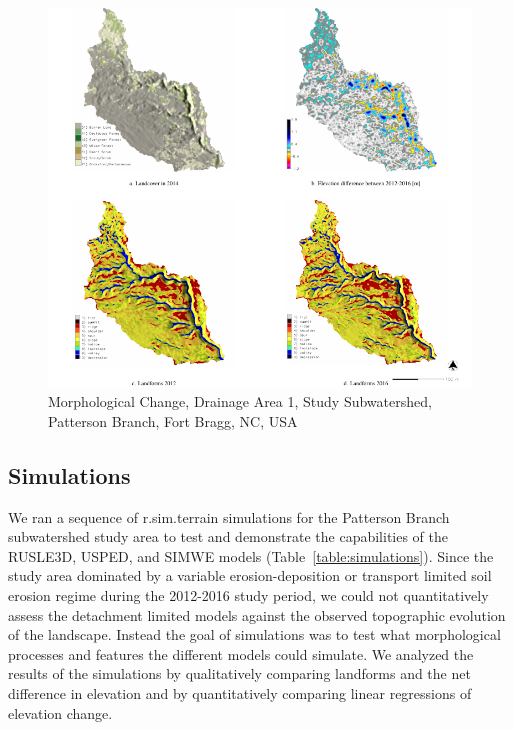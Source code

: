 \documentclass[gmd, manuscript]{copernicus}
\begin{document}
\begin{figure}
\center
\includegraphics[width=\textwidth,height=0.95\textheight,keepaspectratio]{figures/study_area.pdf}
\caption{Morphological Change, Drainage Area 1, Study Subwatershed, Patterson Branch, Fort Bragg, NC, USA}
\label{fig:study_area}
\end{figure}

\subsection{Simulations}
%
We ran a sequence of r.sim.terrain simulations 
for the Patterson Branch subwatershed study area
to test and demonstrate the capabilities 
of the RUSLE3D, USPED, and SIMWE models
(Table~\ref{table:simulations}).
%
Since the study area dominated by
a variable erosion-deposition or transport limited
soil erosion regime during the 2012-2016 study period, 
we could not quantitatively assess the detachment limited models
against the observed topographic evolution of the landscape.
%
Instead the goal of simulations was to test
what morphological processes and features 
the different models could simulate. 
%
We analyzed the results of the simulations 
by qualitatively comparing landforms 
and the net difference in elevation
and by quantitatively comparing 
linear regressions of elevation change.
\end{document}

